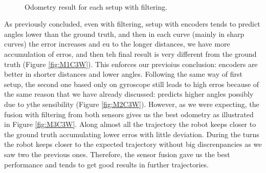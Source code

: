 \documentclass[twoside,conference,a4paper]{IEEEtran}
\begin{document}
\begin{figure}[h]
\begin{center}
{} \hspace{0.1cm}
 \\
\caption{Odometry result for each setup with filtering.}
\label{fig:encoders_fusion_extraction_points}
\end{center}
\end{figure}

As previously concluded, even with filtering, setup with encoders tends to predict angles lower than the ground truth,
and then in each curve (mainly in sharp curves) the error increases and eu to the longer distances, we have more 
accumulation of erros, and then teh final result is very different from the ground truth (Figure \ref{fig:M1C3W}). This 
enforces our previoius conclusion: encoders are better in shorter distances and lower angles. Following the same way of 
first setup, the second one based only on gyroscope still leads to high erros because of the same reason that we have 
already discussed: predicts higher angles possibly due to ythe sensibility (Figure \ref{fig:M2C3W}). However, as we were 
expecting, the fusion with filtering from both sensors gives us the best odometry as illustrated in Figure \ref{fig:M3C3W}. Along almost all the trajectory the robot keeps closer to the ground truth accumulating lower erros with little 
deviation. During the turns the robot keeps closer to the expected trajectory without big discrenpancies as we saw two 
the previous ones. Therefore, the sensor fusion gave us the best performance and tends to get good results in further 
trajectories.
\end{document}
